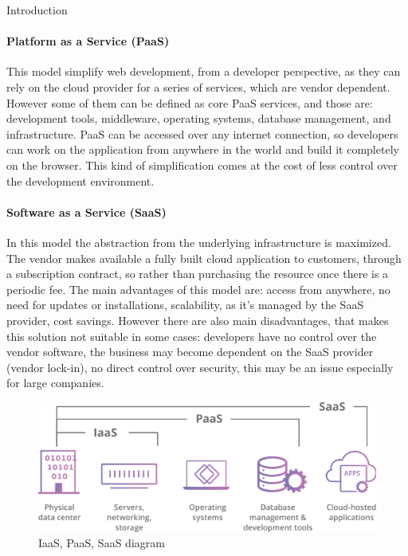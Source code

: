 \begin{chapter}{Introduction}
    \paragraph{Platform as a Service (PaaS)}
    This model simplify web development, from a developer perspective, as they can rely on
    the cloud provider for a series of services, which are vendor dependent. However some
    of them can be defined as core PaaS services, and those are: development tools,
    middleware, operating systems, database management, and infrastructure.
    PaaS can be accessed over any internet connection, so developers can work on the
    application from anywhere in the world and build it completely on the browser. This kind
    of simplification comes at the cost of less control over the development environment.

    \paragraph{Software as a Service (SaaS)}
    In this model the abstraction from the underlying infrastructure is maximized. The vendor
    makes available a fully built cloud application to customers, through a subscription
    contract, so rather than purchasing the resource once there is a periodic fee.
    The main advantages of this model are: access from anywhere, no need for updates or
    installations, scalability, as it's managed by the SaaS provider, cost savings.
    However there are also main disadvantages, that makes this solution not suitable in
    some cases: developers have no control over the vendor software, the business may become
    dependent on the SaaS provider (vendor lock-in), no direct control over security, this
    may be an issue especially for large companies.

    \begin{figure}
        \centering
        \includegraphics[width=\linewidth]{source/images/saas-paas-iaas-diagram.png}
        \caption{IaaS, PaaS, SaaS diagram}
        \label{fig:cloud_computing_architectures}
    \end{figure}


\end{chapter}
